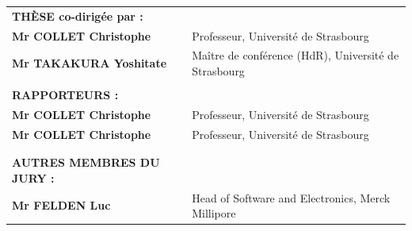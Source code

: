 \begin{titlepage}
\vspace{2.5cm}

\normalsize
\begin{tabular}{l l}
\textbf{\uppercase{Thèse} co-dirigée par :} & \\
\textbf{Mr \uppercase{Collet} Christophe} & Professeur, Université de Strasbourg\\
\textbf{Mr \uppercase{Takakura} Yoshitate} & Maître de conférence (HdR), Université de Strasbourg\\
& \\
\textbf{\uppercase{Rapporteurs} :} & \\
\textbf{Mr \uppercase{Collet} Christophe} & Professeur, Université de Strasbourg\\
\textbf{Mr \uppercase{Collet} Christophe} & Professeur, Université de Strasbourg\\
& \\\hline
& \\
\textbf{\uppercase{Autres membres du jury} :} & \\
\textbf{Mr \uppercase{Felden} Luc} & Head of Software and Electronics, Merck Millipore\\
\end{tabular}



\end{titlepage}